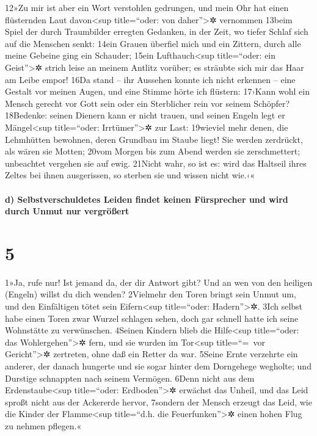 12»Zu mir ist aber ein Wort verstohlen gedrungen, und mein Ohr hat einen
flüsternden Laut davon\textless sup title=``oder: von
daher''\textgreater✲ vernommen 13beim Spiel der durch Traumbilder
erregten Gedanken, in der Zeit, wo tiefer Schlaf sich auf die Menschen
senkt: 14ein Grauen überfiel mich und ein Zittern, durch alle meine
Gebeine ging ein Schauder; 15ein Lufthauch\textless sup title=``oder:
ein Geist''\textgreater✲ strich leise an meinem Antlitz vorüber; es
sträubte sich mir das Haar am Leibe empor! 16Da stand -- ihr Aussehen
konnte ich nicht erkennen -- eine Gestalt vor meinen Augen, und eine
Stimme hörte ich flüstern: 17›Kann wohl ein Mensch gerecht vor Gott sein
oder ein Sterblicher rein vor seinem Schöpfer? 18Bedenke: seinen Dienern
kann er nicht trauen, und seinen Engeln legt er Mängel\textless sup
title=``oder: Irrtümer''\textgreater✲ zur Last: 19wieviel mehr denen,
die Lehmhütten bewohnen, deren Grundbau im Staube liegt! Sie werden
zerdrückt, als wären sie Motten; 20vom Morgen bis zum Abend werden sie
zerschmettert; unbeachtet vergehen sie auf ewig. 21Nicht wahr, so ist
es: wird das Haltseil ihres Zeltes bei ihnen ausgerissen, so sterben sie
und wissen nicht wie.‹«

\hypertarget{d-selbstverschuldetes-leiden-findet-keinen-fuxfcrsprecher-und-wird-durch-unmut-nur-vergruxf6uxdfert}{%
\paragraph{d) Selbstverschuldetes Leiden findet keinen Fürsprecher und
wird durch Unmut nur
vergrößert}\label{d-selbstverschuldetes-leiden-findet-keinen-fuxfcrsprecher-und-wird-durch-unmut-nur-vergruxf6uxdfert}}

\hypertarget{section-4}{%
\section{5}\label{section-4}}

1»Ja, rufe nur! Ist jemand da, der dir Antwort gibt? Und an wen von den
heiligen (Engeln) willst du dich wenden? 2Vielmehr den Toren bringt sein
Unmut um, und den Einfältigen tötet sein Eifern\textless sup
title=``oder: Hadern''\textgreater✲. 3Ich selbst habe einen Toren zwar
Wurzel schlagen sehen, doch gar schnell hatte ich seine Wohnstätte zu
verwünschen. 4Seinen Kindern blieb die Hilfe\textless sup title=``oder:
das Wohlergehen''\textgreater✲ fern, und sie wurden im Tor\textless sup
title=``=~vor Gericht''\textgreater✲ zertreten, ohne daß ein Retter da
war. 5Seine Ernte verzehrte ein anderer, der danach hungerte und sie
sogar hinter dem Dorngehege wegholte; und Durstige schnappten nach
seinem Vermögen. 6Denn nicht aus dem Erdenstaube\textless sup
title=``oder: Erdboden''\textgreater✲ erwächst das Unheil, und das Leid
sproßt nicht aus der Ackererde hervor, 7sondern der Mensch erzeugt das
Leid, wie die Kinder der Flamme\textless sup title=``d.h. die
Feuerfunken''\textgreater✲ einen hohen Flug zu nehmen pflegen.«

